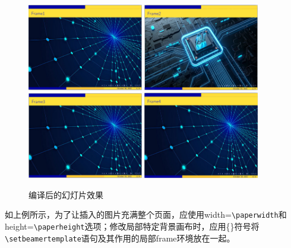 \begin{figure}[htbp]
    \centering
    \includegraphics[width = 0.45\textwidth]{images/ch_9/eg6_9_1.png}
    \includegraphics[width = 0.45\textwidth]{images/ch_9/eg6_9_2.png}
    \includegraphics[width = 0.45\textwidth]{images/ch_9/eg6_9_3.png}
    \includegraphics[width = 0.45\textwidth]{images/ch_9/eg6_9_4.png}
    \caption{编译后的幻灯片效果}
    \label{fig:949}
\end{figure}

如上例所示，为了让插入的图片充满整个页面，应使用width=\texttt{\textbackslash{}paperwidth}和height=\texttt{\textbackslash{}paperheight}选项；修改局部特定背景画布时，应用\{\}符号将\texttt{\textbackslash{}setbeamertemplate}语句及其作用的局部frame环境放在一起。

